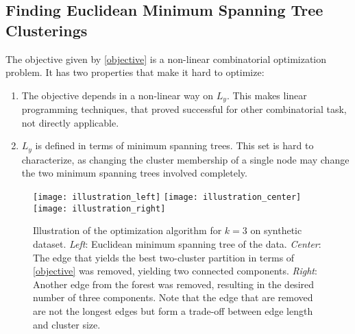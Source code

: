 \subsection{Finding Euclidean Minimum Spanning Tree Clusterings}
The objective given by \eqref{objective} is a non-linear combinatorial
optimization problem. It has two properties that make it hard to optimize:
\begin{enumerate}
    \item The objective depends in a non-linear way on $L_y$.
        This makes linear programming techniques, that proved successful for
        other combinatorial task, not directly applicable.
    \item $L_y$ is defined in terms of minimum spanning trees. This set is hard
        to characterize, as changing the cluster membership of a single node may change
        the two minimum spanning trees involved completely.
\end{enumerate}

\begin{figure}
\centering
\texttt{[image: illustration\_left]}
\texttt{[image: illustration\_center]}
\texttt{[image: illustration\_right]}
\caption{Illustration of the optimization algorithm for $k=3$ on synthetic
dataset. \emph{Left}: Euclidean minimum spanning tree of the data.
\emph{Center}: The edge that yields the best two-cluster partition in terms of
\eqref{objective} was removed, yielding two connected components. \emph{Right}:
Another edge from the forest was removed, resulting in the desired number of
three components. Note that the edge that are removed are not the longest edges
but form a trade-off between edge length and cluster size.}
\label{illustration}
\end{figure}

